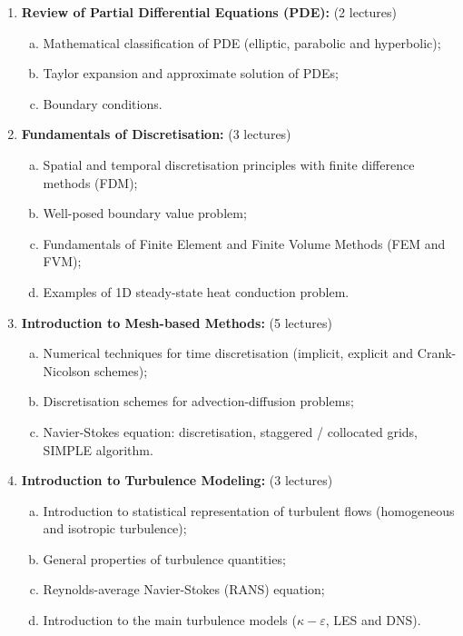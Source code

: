 \documentclass[12pts,a4paper,amsmath,amssymb,floatfix]{article}%
\begin{document}
\begin{enumerate}[{\bf Module 1}]
\item {\bf Review of Partial Differential Equations (PDE):} (2 lectures)\label{Mod:ReviewPDE}
   \begin{enumerate}[(a)]
      \item Mathematical classification of PDE (elliptic, parabolic and hyperbolic);
      \item Taylor expansion and approximate solution of PDEs;
      \item Boundary conditions.
   \end{enumerate}

\item {\bf Fundamentals of Discretisation:} (3 lectures)\label{Mod:Discretisation}
   \begin{enumerate}[(a)]
      \item Spatial and temporal discretisation principles with finite difference methods (FDM);
      \item Well-posed boundary value problem;
      \item Fundamentals of Finite Element and Finite Volume Methods (FEM and FVM);
      \item Examples of 1D steady-state heat conduction problem.
   \end{enumerate}

\item {\bf Introduction to Mesh-based Methods:} (5 lectures)\label{Mod:AdvDiffMethods}
   \begin{enumerate}[(a)]
      \item Numerical techniques for time discretisation (implicit, explicit and Crank-Nicolson schemes);
      \item Discretisation schemes for advection-diffusion problems;%
      \item Navier-Stokes equation: discretisation, staggered / collocated grids, SIMPLE algorithm.
   \end{enumerate}

\item {\bf Introduction to Turbulence Modeling:} (3 lectures)\label{Mod:Turbulence}
   \begin{enumerate}[(a)]
      \item Introduction to statistical representation of turbulent flows (homogeneous and isotropic turbulence);
      \item General properties of turbulence quantities;
      \item Reynolds-average Navier-Stokes (RANS) equation;
      \item Introduction to the main turbulence models ($\kappa-\varepsilon$, LES and DNS).
   \end{enumerate}


\end{enumerate}
\end{document}
